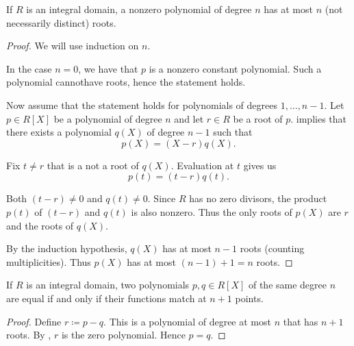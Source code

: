 \begin{proposition}\label{thm:integral_domain_polynomial_root_limit}
  If \( R \) is an integral domain, a nonzero polynomial of degree \( n \) has at most \( n \) (not necessarily distinct) roots.
\end{proposition}
\begin{proof}
  We will use induction on \( n \).

  In the case \( n = 0 \), we have that \( p \) is a nonzero constant polynomial. Such a polynomial cannot\LEM have roots, hence the statement holds.

  Now assume that the statement holds for polynomials of degrees \( 1, \ldots, n - 1 \). Let \( p \in R[X] \) be a polynomial of degree \( n \) and let \( r \in R \) be a root of \( p \).  implies that there exists a polynomial \( q(X) \) of degree \( n - 1 \) such that
  \begin{equation*}
    p(X) = (X - r) q(X).
  \end{equation*}

  Fix \( t \neq r \) that is a not a root of \( q(X) \). Evaluation at \( t \) gives us
  \begin{equation*}
    p(t) = (t - r) q(t).
  \end{equation*}

  Both \( (t - r) \neq 0 \) and \( q(t) \neq 0 \). Since \( R \) has no zero divisors, the product \( p(t) \) of \( (t - r) \) and \( q(t) \) is also nonzero. Thus the only roots of \( p(X) \) are \( r \) and the roots of \( q(X) \).

  By the induction hypothesis, \( q(X) \) has at most \( n - 1 \) roots (counting multiplicities). Thus \( p(X) \) has at most \( (n - 1) + 1 = n \) roots.
\end{proof}

\begin{proposition}\label{thm:polynomials_with_identical_roots}
  If \( R \) is an integral domain, two polynomials \( p, q \in R[X] \) of the same degree \( n \) are equal if and only if their functions match at \( n + 1 \) points.
\end{proposition}
\begin{proof}
  Define \( r \coloneqq p - q \). This is a polynomial of degree at most \( n \) that has \( n + 1 \) roots. By , \( r \) is the zero polynomial. Hence \( p = q \).
\end{proof}

